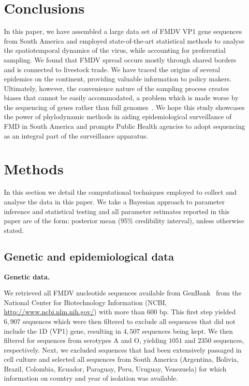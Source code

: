\documentclass[10pt]{article}
\begin{document}
\section*{Conclusions}

In this paper, we have assembled a large data set of FMDV VP1 gene sequences from South America and employed state-of-the-art statistical methods to analyse the spatiotemporal dynamics of the virus, while accounting for preferential sampling. %
We found that FMDV spread occurs mostly through shared borders and  is connected to livestock trade.
We have traced the origins of several epidemics on the continent, providing valuable information to policy makers.
Ultimately, however, the convenience nature of the sampling process creates biases that cannot be easily accommodated, a problem which is made worse by the sequencing of genes rather than full genomes~\citep{Dudas2019}.
We hope this study showcases the power of phylodynamic methods in aiding epidemiological surveillance of FMD in South America and prompts Public Health agencies to adopt sequencing as an integral part of the surveillance apparatus. 

\section*{Methods}

In this section we detail the computational techniques employed to collect and analyse the data in this paper.
We take a Bayesian approach to parameter inference and statistical testing and all parameter estimates reported in this paper are of the form: posterior mean (95\% credibility interval), unless otherwise stated.

\subsection*{Genetic and epidemiological data}

\textbf{Genetic data.}

We retrieved all FMDV nucleotide sequences available from GenBank~\citep{Benson2013} from the National Center for Biotechnology Information (NCBI, \url{ http://www.ncbi.nlm.nih.gov/}) with more than $600$ bp.
This first step yielded $6, 907$ sequences which were then filtered to exclude all sequences that did not include the 1D (VP1) gene, resulting in $4, 507$ sequences being kept.
We then filtered for sequences from serotypes A and O, yielding $1051$ and $2350$ sequences, respectively.
Next, we excluded sequences that had been extensively passaged in cell culture and selected all sequences from South America (Argentina, Bolivia, Brazil, Colombia, Ecuador, Paraguay, Peru, Uruguay, Venezuela) for which information on country and year of isolation was available.
\end{document}
